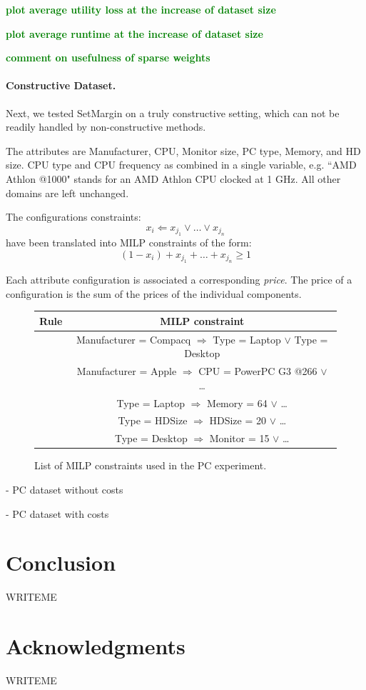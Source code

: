\documentclass{article}
\renewcommand\[{\begin{equation}}
\renewcommand\]{\end{equation}}
\newcommand{\stefano}[1]{{\bf \textcolor{green}{{\fbox{Stefano:} #1}}}}
\begin{document}
\stefano{plot average utility loss at the increase of dataset size}

\stefano{plot average runtime at the increase of dataset size}

\stefano{comment on usefulness of sparse weights}

\paragraph{Constructive Dataset.} Next, we tested {\sc SetMargin} on a truly
constructive setting, which can not be readily handled by non-constructive
methods.

The attributes are Manufacturer, CPU, Monitor size, PC type, Memory, and HD
size. CPU type and CPU frequency as combined in a single variable, e.g. ``AMD
Athlon @1000" stands for an AMD Athlon CPU clocked at 1 GHz. All other domains
are left unchanged.

The configurations constraints:
%
$$ x_i \Leftarrow x_{j_1} \lor \ldots \lor x_{j_n} $$
%
have been translated into MILP constraints of the form:
%
$$ (1 - x_i) + x_{j_1} + \ldots + x_{j_n} \ge 1 $$

Each attribute configuration is associated a corresponding {\em price}. The
price of a configuration is the sum of the prices of the individual components.

\begin{figure}
    {\footnotesize
    \begin{tabular}{cc}
        {\bf Rule} & {\bf MILP constraint} \\ \hline\hline
        & Manufacturer = Compacq $\Rightarrow$ Type = Laptop $\lor$ Type = Desktop \\
        & Manufacturer = Apple $\Rightarrow$ CPU = PowerPC G3 @266 $\lor$ \ldots \\
        & Type = Laptop $\Rightarrow$ Memory = 64 $\lor$ \ldots \\
        & Type = HDSize $\Rightarrow$ HDSize = 20 $\lor$ \ldots \\
        & Type = Desktop $\Rightarrow$ Monitor = 15 $\lor$ \ldots \\
    \end{tabular}
    }
    \caption{\label{tab:pcconstraints} List of MILP constraints used in the
    PC experiment.}
\end{figure}

- PC dataset without costs

- PC dataset with costs

\section{Conclusion}

WRITEME

\section*{Acknowledgments}

WRITEME



\end{document}
